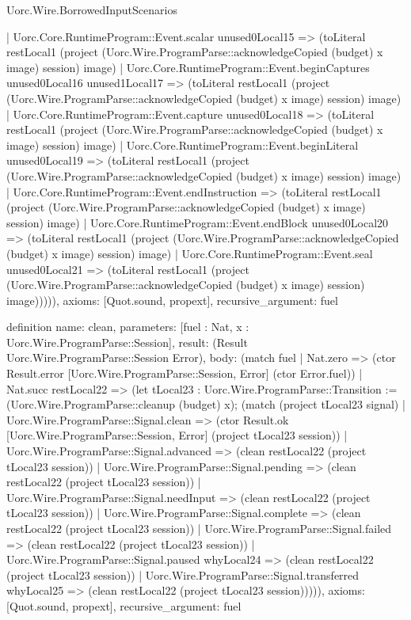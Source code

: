 \begin{lexlean}{Uorc.Wire.BorrowedInputScenarios}
\begin{semanticmodule}
{          | Uorc.Core.RuntimeProgram::Event.scalar unused0Local15 => (toLiteral restLocal1 (project (Uorc.Wire.ProgramParse::acknowledgeCopied (budget) x image) session) image)
          | Uorc.Core.RuntimeProgram::Event.beginCaptures unused0Local16 unused1Local17 => (toLiteral restLocal1 (project (Uorc.Wire.ProgramParse::acknowledgeCopied (budget) x image) session) image)
          | Uorc.Core.RuntimeProgram::Event.capture unused0Local18 => (toLiteral restLocal1 (project (Uorc.Wire.ProgramParse::acknowledgeCopied (budget) x image) session) image)
          | Uorc.Core.RuntimeProgram::Event.beginLiteral unused0Local19 => (toLiteral restLocal1 (project (Uorc.Wire.ProgramParse::acknowledgeCopied (budget) x image) session) image)
          | Uorc.Core.RuntimeProgram::Event.endInstruction => (toLiteral restLocal1 (project (Uorc.Wire.ProgramParse::acknowledgeCopied (budget) x image) session) image)
          | Uorc.Core.RuntimeProgram::Event.endBlock unused0Local20 => (toLiteral restLocal1 (project (Uorc.Wire.ProgramParse::acknowledgeCopied (budget) x image) session) image)
          | Uorc.Core.RuntimeProgram::Event.seal unused0Local21 => (toLiteral restLocal1 (project (Uorc.Wire.ProgramParse::acknowledgeCopied (budget) x image) session) image))))),
  axioms: [Quot.sound, propext],
  recursive_argument: fuel
}

definition{
  name: clean,
  parameters: [fuel : Nat, x : Uorc.Wire.ProgramParse::Session],
  result: (Result Uorc.Wire.ProgramParse::Session Error),
  body: (match fuel
    | Nat.zero => (ctor Result.error [Uorc.Wire.ProgramParse::Session, Error] (ctor Error.fuel))
    | Nat.succ restLocal22 => (let tLocal23 : Uorc.Wire.ProgramParse::Transition := (Uorc.Wire.ProgramParse::cleanup (budget) x); (match (project tLocal23 signal)
      | Uorc.Wire.ProgramParse::Signal.clean => (ctor Result.ok [Uorc.Wire.ProgramParse::Session, Error] (project tLocal23 session))
      | Uorc.Wire.ProgramParse::Signal.advanced => (clean restLocal22 (project tLocal23 session))
      | Uorc.Wire.ProgramParse::Signal.pending => (clean restLocal22 (project tLocal23 session))
      | Uorc.Wire.ProgramParse::Signal.needInput => (clean restLocal22 (project tLocal23 session))
      | Uorc.Wire.ProgramParse::Signal.complete => (clean restLocal22 (project tLocal23 session))
      | Uorc.Wire.ProgramParse::Signal.failed => (clean restLocal22 (project tLocal23 session))
      | Uorc.Wire.ProgramParse::Signal.paused whyLocal24 => (clean restLocal22 (project tLocal23 session))
      | Uorc.Wire.ProgramParse::Signal.transferred whyLocal25 => (clean restLocal22 (project tLocal23 session))))),
  axioms: [Quot.sound, propext],
  recursive_argument: fuel
}


\end{semanticmodule}
\end{lexlean}
